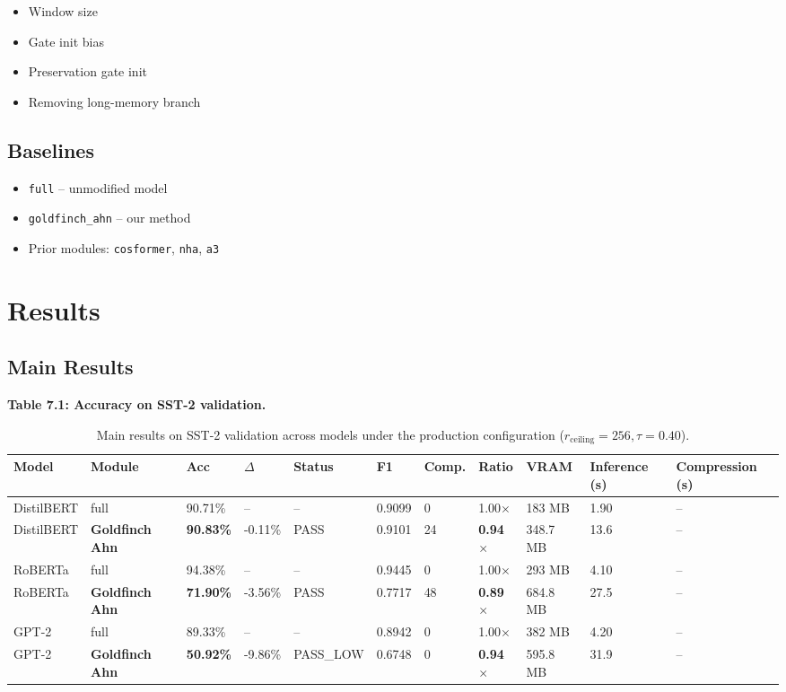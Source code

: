 \begin{itemize}
\item Window size
\item Gate init bias
\item Preservation gate init
\item Removing long-memory branch

\end{itemize}
\subsection{Baselines}

\begin{itemize}
\item \texttt{full} -- unmodified model
\item \texttt{goldfinch\_ahn} -- our method
\item Prior modules: \texttt{cosformer}, \texttt{nha}, \texttt{a3}

\end{itemize}



\section{Results}

\subsection{Main Results}

\textbf{Table 7.1: Accuracy on SST-2 validation.}

\begin{table}[t]
\centering
\small
\begin{tabular}{lllllllllll}
\toprule
\textbf{Model} & \textbf{Module} & \textbf{Acc} & \textbf{$\Delta$} & \textbf{Status} & \textbf{F1} & \textbf{Comp.} & \textbf{Ratio} & \textbf{VRAM} & \textbf{Inference (s)} & \textbf{Compression (s)} \\
\midrule
DistilBERT & full & 90.71\% & -- & -- & 0.9099 & 0 & 1.00$\times$ & 183 MB & 1.90 & -- \\
DistilBERT & \textbf{Goldfinch Ahn} & \textbf{90.83\%} & -0.11\% & PASS & 0.9101 & 24 & \textbf{0.94$\times$} & 348.7 MB & 13.6 & -- \\
RoBERTa & full & 94.38\% & -- & -- & 0.9445 & 0 & 1.00$\times$ & 293 MB & 4.10 & -- \\
RoBERTa & \textbf{Goldfinch Ahn} & \textbf{71.90\%} & -3.56\% & PASS & 0.7717 & 48 & \textbf{0.89$\times$} & 684.8 MB & 27.5 & -- \\
GPT-2 & full & 89.33\% & -- & -- & 0.8942 & 0 & 1.00$\times$ & 382 MB & 4.20 & -- \\
GPT-2 & \textbf{Goldfinch Ahn} & \textbf{50.92\%} & -9.86\% & PASS\_LOW & 0.6748 & 0 & \textbf{0.94$\times$} & 595.8 MB & 31.9 & -- \\
\bottomrule
\end{tabular}
\caption{Main results on SST-2 validation across models under the production configuration ($r_{\mathrm{ceiling}}=256, \tau=0.40$).}
\label{tab:main_sst2}
\end{table}


